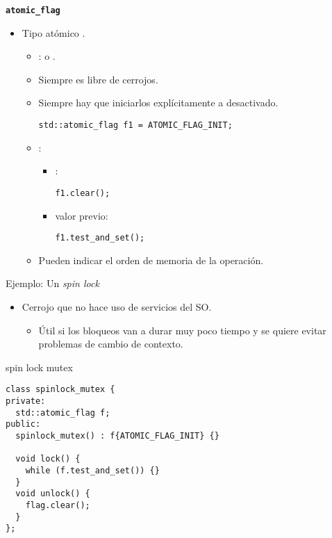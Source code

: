 \begin{frame}[t,fragile]{\texttt{\textbf{atomic\_flag}}}
\begin{itemize}
  \item Tipo atómico .
    \begin{itemize}
      \item {}:  o .
      \item Siempre es libre de cerrojos.

      \item Siempre hay que iniciarlos explícitamente a desactivado.
\begin{lstlisting}
std::atomic_flag f1 = ATOMIC_FLAG_INIT;
\end{lstlisting}

      \item {}:
        \begin{itemize}
          \item {}: 
\begin{lstlisting}
f1.clear();
\end{lstlisting}
          \item {} valor previo: 
\begin{lstlisting}
f1.test_and_set();
\end{lstlisting}
        \end{itemize}
      \item Pueden indicar el orden de memoria de la operación. 
    \end{itemize}
\end{itemize}
\end{frame}

\begin{frame}[t,fragile]{Ejemplo: Un \emph{spin lock}}
\begin{itemize}
  \item Cerrojo que no hace uso de servicios del SO.
    \begin{itemize}
      \item Útil si los bloqueos van a durar muy poco tiempo y se quiere evitar problemas de cambio de contexto.
    \end{itemize}
\end{itemize}
\begin{block}{spin lock mutex}
\begin{lstlisting}
class spinlock_mutex {
private:
  std::atomic_flag f;
public:
  spinlock_mutex() : f{ATOMIC_FLAG_INIT} {}

  void lock() {
    while (f.test_and_set()) {}
  }
  void unlock() {
    flag.clear();
  }
};
\end{lstlisting}
\end{block}
\end{frame}

